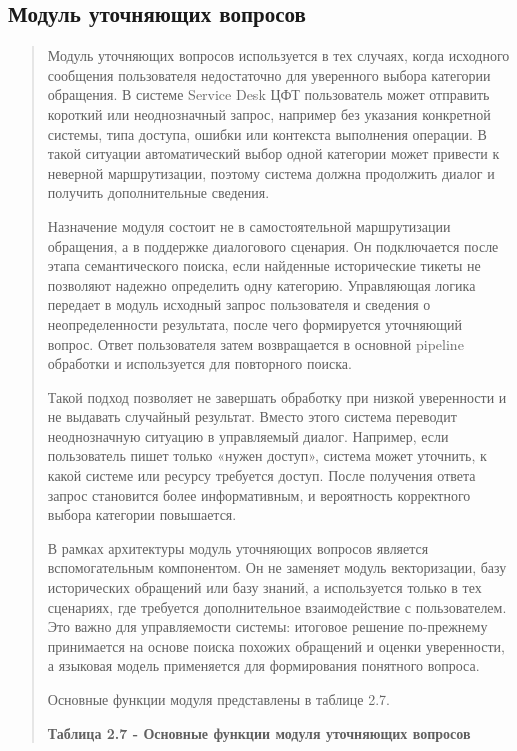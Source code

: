 \hypertarget{ux43cux43eux434ux443ux43bux44c-ux443ux442ux43eux447ux43dux44fux44eux449ux438ux445-ux432ux43eux43fux440ux43eux441ux43eux432}{%
\subsection{Модуль уточняющих
вопросов}\label{ux43cux43eux434ux443ux43bux44c-ux443ux442ux43eux447ux43dux44fux44eux449ux438ux445-ux432ux43eux43fux440ux43eux441ux43eux432}}

\begin{quote}
Модуль уточняющих вопросов используется в тех случаях, когда исходного
сообщения пользователя недостаточно для уверенного выбора категории
обращения. В системе Service Desk ЦФТ пользователь может отправить
короткий или неоднозначный запрос, например без указания конкретной
системы, типа доступа, ошибки или контекста выполнения операции. В такой
ситуации автоматический выбор одной категории может привести к неверной
маршрутизации, поэтому система должна продолжить диалог и получить
дополнительные сведения.

Назначение модуля состоит не в самостоятельной маршрутизации обращения,
а в поддержке диалогового сценария. Он подключается после этапа
семантического поиска, если найденные исторические тикеты не позволяют
надежно определить одну категорию. Управляющая логика передает в модуль
исходный запрос пользователя и сведения о неопределенности результата,
после чего формируется уточняющий вопрос. Ответ пользователя затем
возвращается в основной pipeline обработки и используется для повторного
поиска.

Такой подход позволяет не завершать обработку при низкой уверенности и
не выдавать случайный результат. Вместо этого система переводит
неоднозначную ситуацию в управляемый диалог. Например, если пользователь
пишет только «нужен доступ», система может уточнить, к какой системе или
ресурсу требуется доступ. После получения ответа запрос становится более
информативным, и вероятность корректного выбора категории повышается.

В рамках архитектуры модуль уточняющих вопросов является вспомогательным
компонентом. Он не заменяет модуль векторизации, базу исторических
обращений или базу знаний, а используется только в тех сценариях, где
требуется дополнительное взаимодействие с пользователем. Это важно для
управляемости системы: итоговое решение по-прежнему принимается на
основе поиска похожих обращений и оценки уверенности, а языковая модель
применяется для формирования понятного вопроса.

Основные функции модуля представлены в таблице 2.7.

\textbf{Таблица 2.7 - Основные функции модуля уточняющих вопросов}
\end{quote}

